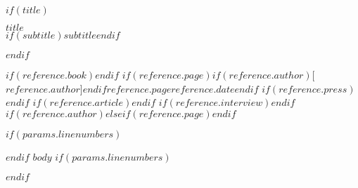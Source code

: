 \documentclass[11pt,a4paper,$params.lang$,
$for(classoption)$
  $classoption$$sep$,
$endfor$$if(subclass)$,$subclass$$endif$]{exam}
\begin{document}
$if(title)$
\begin{center}
\Huge \textsc{\textbf{$title$}} \\
$if(subtitle)$\large\textbf{$subtitle$}$endif$
\end{center}
$endif$

$if(reference.book)$$endif$
$if(reference.page)$\AlPage$if(reference.author)$[$reference.author$]$endif${$reference.page$}{$reference.date$}$endif$
$if(reference.press)$$endif$
$if(reference.article)$$endif$
$if(reference.interview)$$endif$
$if(reference.author)$\vspace{.5cm}$elseif(reference.page)$\vspace{.5cm}$endif$

$if(params.linenumbers)$\begin{linenumbers}$endif$
$body$
$if(params.linenumbers)$\end{linenumbers}$endif$
\end{document}
